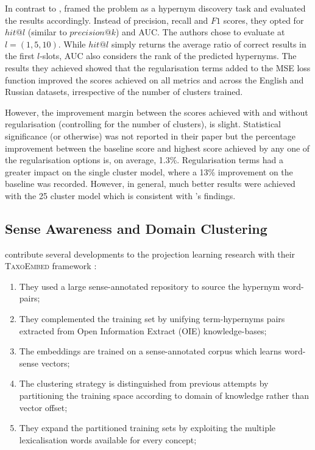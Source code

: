 In contrast to \citep{Fu2014}, \citeauthor{ustalov2017negative} framed the problem as a hypernym discovery task and evaluated the results accordingly.  Instead of precision, recall and $F1$ scores, they opted for $hit@l$ (similar to $precision@k$) and \ac{AUC}.  The authors chose to evaluate at $l=(1, 5, 10)$.  While $hit@l$ simply returns the average ratio of correct results in the first $l$-slots, \ac{AUC} also considers the rank of the predicted hypernyms.  The results they achieved showed that the regularisation terms added to the \ac{MSE} loss function improved the scores achieved on all metrics and across the English and Russian datasets, irrespective of the number of clusters trained.  

However, the improvement margin between the scores achieved with and without regularisation (controlling for the number of clusters), is slight.  Statistical significance (or otherwise) was not reported in their paper but the percentage improvement between the baseline score and highest score achieved by any one of the regularisation options is, on average, 1.3\%.  Regularisation terms had a greater impact on the single cluster model, where a 13\% improvement on the baseline was recorded.  However, in general, much better results were achieved with the 25 cluster model which is consistent with \citeauthor{Fu2014}'s findings.

\subsection{Sense Awareness and Domain Clustering}
\citeauthor{espinosa2016supervised} contribute several developments to the projection learning research with their \textsc{TaxoEmbed} framework \citep{espinosa2016supervised}:
\begin{enumerate}
    \item They used a large sense-annotated repository to source the hypernym word-pairs; 
    \item They complemented the training set by unifying term-hypernyms pairs extracted from Open Information Extract (OIE) knowledge-bases;
    \item The embeddings are trained on a sense-annotated corpus which learns word-sense vectors;
    \item The clustering strategy is distinguished from previous attempts by partitioning the training space according to domain of knowledge rather than vector offset;
    \item They expand the partitioned training sets by exploiting the multiple lexicalisation words available for every concept;
\end{enumerate}

